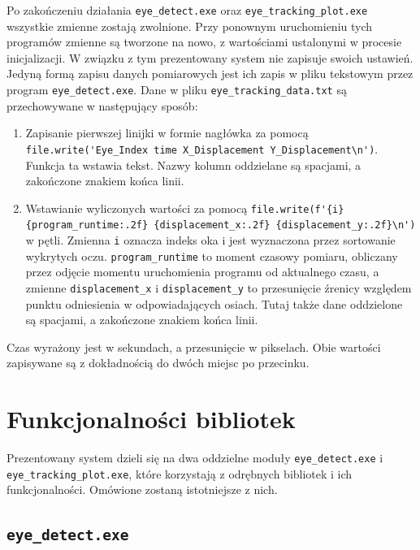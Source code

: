 \documentclass[a4paper,twoside,12pt]{book}
\begin{document}
Po zakończeniu działania \texttt{eye\-\_detect\-.exe} oraz \texttt{eye\_\-tracking\_\-plot\-.exe} wszystkie zmienne zostają zwolnione. Przy ponownym uruchomieniu tych programów zmienne są tworzone na nowo, z wartościami ustalonymi w procesie inicjalizacji. W związku z tym prezentowany system nie zapisuje swoich ustawień. Jedyną formą zapisu danych pomiarowych jest ich zapis w pliku tekstowym przez program \texttt{eye\-\_detect.exe}. Dane w pliku \texttt{eye\-\_tracking\-\_data.txt} są przechowywane w następujący sposób:

\begin{enumerate}
	\item Zapisanie pierwszej linijki w formie nagłówka za pomocą \lstinline|file.write('Eye_Index time X_Displacement Y_Displacement\n')|. Funkcja ta wstawia tekst. Nazwy kolumn oddzielane są spacjami, a zakończone znakiem końca linii.
	\item Wstawianie wyliczonych wartości za pomocą \lstinline|file.write(f'{i} {program_runtime:.2f} {displacement_x:.2f} {displacement_y:.2f}\n')| w pętli. Zmienna \texttt{i} oznacza indeks oka i jest wyznaczona przez sortowanie wykrytych oczu. \texttt{program\-\_runtime} to moment czasowy pomiaru, obliczany przez odjęcie momentu uruchomienia programu od aktualnego czasu, a zmienne \texttt{displacement\-\_x} i \texttt{displacement\-\_y} to przesunięcie źrenicy względem punktu odniesienia w odpowiadających osiach. Tutaj także dane oddzielone są spacjami, a zakończone znakiem końca linii.
\end{enumerate}

Czas wyrażony jest w sekundach, a przesunięcie w pikselach. Obie wartości zapisywane są z dokładnością do dwóch miejsc po przecinku.

\section{Funkcjonalności bibliotek}
\label{sec:Funkcjonalnosci-bibliotek}

Prezentowany system dzieli się na dwa oddzielne moduły \texttt{eye\-\_detect\-.exe} i \texttt{eye\_\-tracking\_\-plot\-.exe}, które korzystają z odrębnych bibliotek i ich funkcjonalności. Omówione zostaną istotniejsze z nich.

\subsection{\texttt{eye\-\_detect\-.exe}}
\label{subsec:eye-detect.exe}
\end{document}
